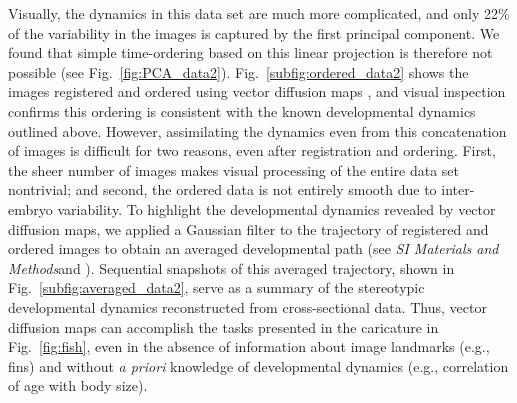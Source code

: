 \documentclass{pnastwo}
\makeatletter
\newcommand{\SI}[0]{{\it SI Materials and Methods}}
\newcommand{\fig}[0]{Fig.}
\newcommand{\customlabel}[2]{%
\protected@write \@auxout {}{\string \newlabel {#1}{{#2}{}}}}
\makeatother
\begin{document}
\begin{article}


Visually, the dynamics in this data set are much more complicated, and only 22\% of the variability in the images is captured by the first principal component.
%
We found that simple time-ordering based on this linear projection is therefore not possible (see \fig~\ref{fig:PCA_data2}).
%
\fig~\ref{subfig:ordered_data2} shows the images registered and ordered using vector diffusion maps \cite{singer2012vector}, 
and visual inspection confirms this ordering is consistent with the known developmental dynamics outlined above.
%
However, assimilating the dynamics even from this concatenation of images is difficult for two reasons, even after registration and ordering.
%
First, the sheer number of images makes visual processing of the entire data set nontrivial;
and second, the ordered data is not entirely smooth due to inter-embryo variability.
%
To highlight the developmental dynamics revealed by vector diffusion maps, we applied a Gaussian filter to the trajectory of registered and ordered images to obtain an averaged developmental path (see \SI and  \cite{kemelmacher2011exploring}).  
%
Sequential snapshots of this averaged trajectory, shown in \fig~\ref{subfig:averaged_data2}, serve as a summary of the stereotypic developmental dynamics reconstructed from cross-sectional data.
%
Thus, vector diffusion maps can accomplish the tasks presented in the caricature in \fig~\ref{fig:fish}, even in the absence of information about image landmarks (e.g., fins) and without {\it a priori} knowledge of developmental dynamics (e.g., correlation of age with body size).





\end{article}
\end{document}
